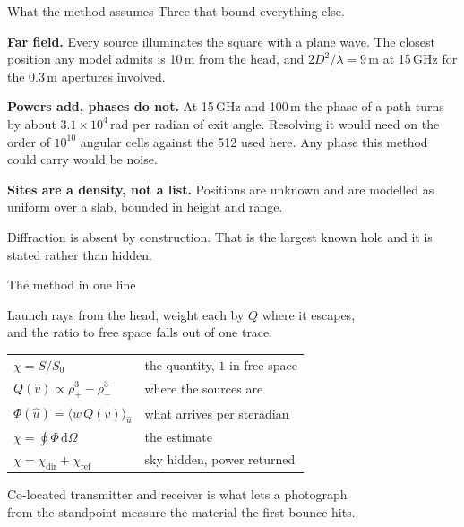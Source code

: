\documentclass[aspectratio=169,11pt]{beamer}
\newcommand{\uloc}{\hat{u}}
\newcommand{\uext}{\hat{v}}
\newcommand{\dOmega}{\,\mathrm{d}\Omega}
\begin{document}
\begin{frame}{What the method assumes}
  Three that bound everything else.

  \vspace{0.6em}
  \textbf{Far field.} Every source illuminates the square with a plane wave. The
  closest position any model admits is 10\,m from the head, and $2D^2/\lambda =
  9$\,m at 15\,GHz for the 0.3\,m apertures involved.

  \vspace{0.5em}
  \textbf{Powers add, phases do not.} At 15\,GHz and 100\,m the phase of a path
  turns by about $3.1\times10^{4}$\,rad per radian of exit angle. Resolving it
  would need on the order of $10^{10}$ angular cells against the 512 used here.
  Any phase this method could carry would be noise.

  \vspace{0.5em}
  \textbf{Sites are a density, not a list.} Positions are unknown and are modelled
  as uniform over a slab, bounded in height and range.

  \vspace{0.6em}
  Diffraction is absent by construction. That is the largest known hole and it is
  stated rather than hidden.
\end{frame}

\begin{frame}{The method in one line}
  \begin{center}
    \Large
    Launch rays from the head, weight each by $Q$ where it escapes,
    \\[0.3em]
    and the ratio to free space falls out of one trace.
  \end{center}
  \vspace{1.2em}
  \begin{center}
    \begin{tabular}{ll}
      \toprule
      $\chi = S/S_0$ & the quantity, $1$ in free space \\
      $Q(\uext) \propto \rho_+^3 - \rho_-^3$ & where the sources are \\
      $\Phi(\uloc) = \langle w\,Q(\uext)\rangle_{\uloc}$ & what arrives per steradian \\
      $\chi = \oint \Phi \dOmega$ & the estimate \\
      $\chi = \chi_{\mathrm{dir}} + \chi_{\mathrm{ref}}$ & sky hidden, power returned \\
      \bottomrule
    \end{tabular}
  \end{center}
  \vspace{1.0em}
  \begin{center}
    Co-located transmitter and receiver is what lets a photograph
    \\
    from the standpoint measure the material the first bounce hits.
  \end{center}
\end{frame}
\end{document}
